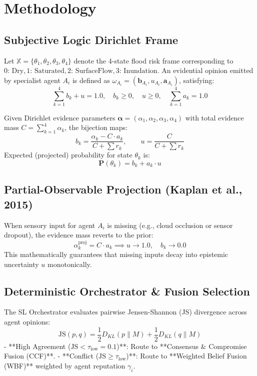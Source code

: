 \section{Methodology}
\label{sec:methodology}

\subsection{Subjective Logic Dirichlet Frame}
Let $\mathbb{X} = \{\theta_1, \theta_2, \theta_3, \theta_4\}$ denote the 4-state flood risk frame corresponding to $\text{0: Dry}, \text{1: Saturated}, \text{2: SurfaceFlow}, \text{3: Inundation}$.
An evidential opinion emitted by specialist agent $A_i$ is defined as $\omega_{A_i} = (\mathbf{b}_{A_i}, u_{A_i}, \mathbf{a}_{A_i})$, satisfying:
\begin{equation}
\sum_{k=1}^4 b_k + u = 1.0, \quad b_k \ge 0, \quad u \ge 0, \quad \sum_{k=1}^4 a_k = 1.0
\end{equation}

Given Dirichlet evidence parameters $\boldsymbol{\alpha} = (\alpha_1, \alpha_2, \alpha_3, \alpha_4)$ with total evidence mass $C = \sum_{k=1}^4 \alpha_k$, the bijection maps:
\begin{equation}
b_k = \frac{\alpha_k - C \cdot a_k}{C + \sum r_k}, \qquad u = \frac{C}{C + \sum r_k}
\end{equation}
Expected (projected) probability for state $\theta_k$ is:
\begin{equation}
\mathbf{P}(\theta_k) = b_k + a_k \cdot u
\end{equation}

\subsection{Partial-Observable Projection (Kaplan et al., 2015)}
When sensory input for agent $A_i$ is missing (e.g., cloud occlusion or sensor dropout), the evidence mass reverts to the prior:
\begin{equation}
\alpha_k^{\text{proj}} = C \cdot a_k \implies u \to 1.0, \quad b_k \to 0.0
\end{equation}
This mathematically guarantees that missing inputs decay into epistemic uncertainty $u$ monotonically.

\subsection{Deterministic Orchestrator & Fusion Selection}
The SL Orchestrator evaluates pairwise Jensen-Shannon (JS) divergence across agent opinions:
\begin{equation}
\text{JS}(p, q) = \frac{1}{2} D_{KL}(p \parallel M) + \frac{1}{2} D_{KL}(q \parallel M)
\end{equation}
- **High Agreement ($\text{JS} < \tau_{\text{low}} = 0.1$)**: Route to **Consensus \& Compromise Fusion (CCF)**.
- **Conflict ($\text{JS} \ge \tau_{\text{low}}$)**: Route to **Weighted Belief Fusion (WBF)** weighted by agent reputation $\gamma_i$.

